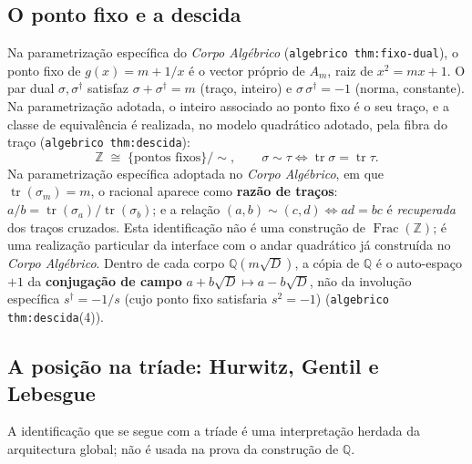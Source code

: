 \documentclass[11pt,a4paper]{article}
\newcommand{\code}[1]{\texttt{\small #1}}
\newcommand{\dg}{^{\dagger}}
\begin{document}
\subsection*{O ponto fixo e a descida}

Na parametrização específica do \emph{Corpo Algébrico}
(\code{algebrico thm:fixo-dual}), o ponto fixo de $g(x)=m+1/x$ é o vector
próprio de $A_m$, raiz de $x^{2}=mx+1$. O par dual $\sigma,\sigma\dg$
satisfaz $\sigma+\sigma\dg=m$ (traço, inteiro) e $\sigma\,\sigma\dg=-1$
(norma, constante). Na parametrização adotada, o inteiro associado ao ponto
fixo é o seu traço, e a classe de equivalência é realizada, no modelo
quadrático adotado, pela fibra do traço
(\code{algebrico thm:descida}):
\[
\mathbb{Z}\;\cong\;\{\text{pontos fixos}\}/{\sim},
\qquad
\sigma\sim\tau\iff\operatorname{tr}\sigma=\operatorname{tr}\tau.
\]
Na parametrização específica adoptada no \emph{Corpo Algébrico}, em que
$\operatorname{tr}(\sigma_m)=m$, o racional aparece como \textbf{razão de
traços}: $a/b = \operatorname{tr}(\sigma_a) / \operatorname{tr}(\sigma_b)$; e a relação $(a,b)\sim(c,d)\iff ad=bc$ é
\emph{recuperada} dos traços cruzados. Esta identificação não é uma construção
de $\operatorname{Frac}(\mathbb{Z})$; é uma realização particular da interface
com o andar quadrático já construída no \emph{Corpo Algébrico}.
Dentro de cada corpo $\mathbb{Q}(m\sqrt D)$, a cópia de $\mathbb{Q}$ é o
auto-espaço $+1$ da \textbf{conjugação de campo}
$a+b\sqrt{D}\mapsto a-b\sqrt{D}$, não da involução específica
$s\dg=-1/s$ (cujo ponto fixo satisfaria $s^{2}=-1$)
(\code{algebrico thm:descida}(4)).

\subsection*{A posição na tríade: Hurwitz, Gentil e Lebesgue}

\noindent A identificação que se segue com a tríade é uma interpretação
herdada da arquitectura global; não é usada na prova da construção de
$\mathbb{Q}$.
\end{document}
